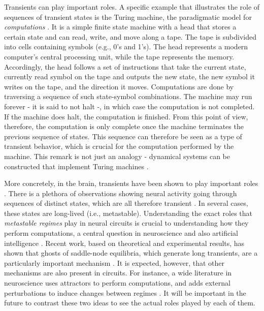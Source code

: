 Transients can play important roles. A specific example that illustrates the role of sequences of transient states is the Turing machine, the paradigmatic model for \textit{computations} \cite{turing1936on, computabilitybook}. It is a simple finite state machine with a head that stores a certain state and can read, write, and move along a tape. The tape is subdivided into cells containing symbols (e.g., 0's and 1's). The head represents a modern computer's central processing unit, while the tape represents the memory. Accordingly, the head follows a set of instructions that take the current state, currently read symbol on the tape and outputs the new state, the new symbol it writes on the tape, and the direction it moves. Computations are done by traversing a sequence of such state-symbol combinations. The machine may run forever - it is said to not halt -, in which case the computation is not completed. If the machine does halt, the computation is finished. From this point of view, therefore, the computation is only complete once the machine terminates the previous sequence of states. This sequence can therefore be seen as a type of transient behavior, which is crucial for the computation performed by the machine. This remark is not just an analogy - dynamical systems can be constructed that implement Turing machines \cite{postlethwaite2024a}.

More concretely, in the brain, transients have been shown to play important roles \cite{ashwin2005when, mazor2005transient}. There is a plethora of observations showing neural activity going through sequences of distinct states, which are all therefore transient \cite{tognoli2014metastable, brinkman2022metastable}. In several cases, these states are long-lived (i.e., metastable). Understanding the exact roles that \textit{metastable regimes} play in neural circuits is crucial to understanding how they perform computations, a central question in neuroscience and also artificial intelligence \cite{koch2024biological, vyas2020computation, sussillo2013opening}. Recent work, based on theoretical and experimental results, has shown that ghosts of saddle-node equilibria, which generate long transients, are a particularly important mechanism \cite{koch2024biological, koch2024ghost, nandan2022cells, mazor2005transient}. It is expected, however, that other mechanisms are also present in circuits. For instance, a wide literature in neuroscience uses attractors to perform computations, and adds external perturbations to induce changes between regimes \cite{driscoll2024flexible, sussillo2013opening, brinkman2022metastable, laje2013robust}. It will be important in the future to contrast these two ideas to see the actual roles played by each of them.

